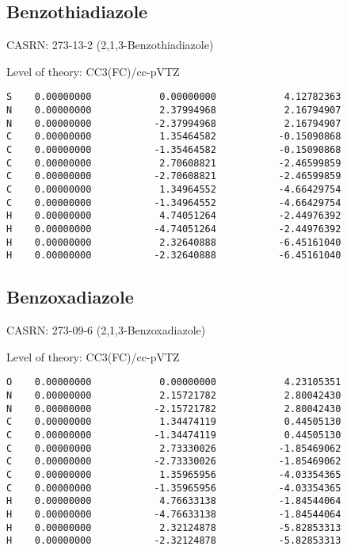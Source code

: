 \documentclass[journal=jctcce,manuscript=article,layout=traditional]{achemso}
\newcommand{\TZ}{cc-pVTZ}
\begin{document}
\subsection{Benzothiadiazole}

CASRN: 273-13-2 (2,1,3-Benzothiadiazole)

\begin{singlespace}
\noindent  Level of theory: CC3(FC)/{\TZ}
\begin{verbatim}
S    0.00000000            0.00000000            4.12782363
N    0.00000000            2.37994968            2.16794907
N    0.00000000           -2.37994968            2.16794907
C    0.00000000            1.35464582           -0.15090868
C    0.00000000           -1.35464582           -0.15090868
C    0.00000000            2.70608821           -2.46599859
C    0.00000000           -2.70608821           -2.46599859
C    0.00000000            1.34964552           -4.66429754
C    0.00000000           -1.34964552           -4.66429754
H    0.00000000            4.74051264           -2.44976392
H    0.00000000           -4.74051264           -2.44976392
H    0.00000000            2.32640888           -6.45161040
H    0.00000000           -2.32640888           -6.45161040
\end{verbatim}
\end{singlespace}

\subsection{Benzoxadiazole}

CASRN: 273-09-6 (2,1,3-Benzoxadiazole)

\begin{singlespace}
\noindent  Level of theory: CC3(FC)/{\TZ}
\begin{verbatim}
O    0.00000000            0.00000000            4.23105351
N    0.00000000            2.15721782            2.80042430
N    0.00000000           -2.15721782            2.80042430
C    0.00000000            1.34474119            0.44505130
C    0.00000000           -1.34474119            0.44505130
C    0.00000000            2.73330026           -1.85469062
C    0.00000000           -2.73330026           -1.85469062
C    0.00000000            1.35965956           -4.03354365
C    0.00000000           -1.35965956           -4.03354365
H    0.00000000            4.76633138           -1.84544064
H    0.00000000           -4.76633138           -1.84544064
H    0.00000000            2.32124878           -5.82853313
H    0.00000000           -2.32124878           -5.82853313
\end{verbatim}
\end{singlespace}
\end{document}
